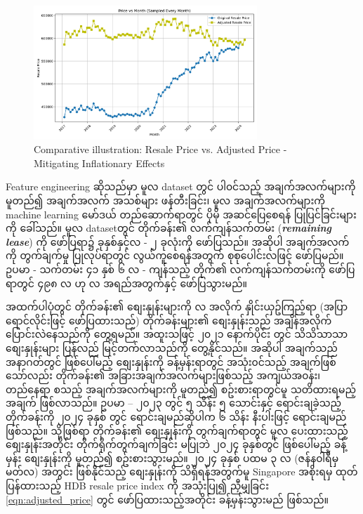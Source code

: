 \begin{figure}[h]%
\centering
\includegraphics[width=0.75\textwidth]{imgs/adjusted_price.png}
\caption{Comparative illustration: Resale Price vs. Adjusted Price - Mitigating Inflationary Effects }\label{fig:priceinflation}
\end{figure}

Feature engineering ဆိုသည်မှာ မူလ dataset တွင် ပါ၀င်သည့် အချက်အလက်များကို မူတည်၍ အချက်အလက် အသစ်များ ဖန်တီးခြင်း၊ မူလ အချက်အလက်များကို machine learning မော်ဒယ် တည်ဆောက်ရာတွင် ပိုမို အဆင်ပြေစေရန် ပြုပြင်ခြင်းများကို ခေါ်သည်။ မူလ datasetတွင် တိုက်ခန်း၏ လက်ကျန်သက်တမ်း (\textit{\textbf{remaining lease}}) ကို ဖော်ပြရာ၌ ခုနှစ်နှင့်လ - ၂ ခုလုံးကို ဖော်ပြသည်။ အဆိုပါ အချက်အလက်ကို တွက်ချက်မှု ပြုလုပ်ရာတွင် လွယ်ကူစေရန်အတွက် စုစုပေါင်းလဖြင့် ဖော်ပြမည်။ ဥပမာ - သက်တမ်း ၄၁ နှစ် ၆ လ - ကျန်သည့် တိုက်၏ လက်ကျန်သက်တမ်းကို ဖော်ပြရာတွင် ၄၉၈ လ ဟု  လ အရည်အတွက်နှင့် ဖော်ပြသွားမည်။ 

အထက်ပါပုံတွင် တိုက်ခန်း၏ စျေးနှုန်းများကို လ အလိုက် နှိုင်းယှဥ်ကြည့်ရာ (အပြာရောင်လိုင်းဖြင့် ဖော်ပြထားသည်) တိုက်ခန်းများ၏ စျေးနှုန်းသည် အချိန်အလိုက် ပြောင်းလဲနေသည်ကို တွေ့ရမည်။ အထူးသဖြင့် ၂၀၂၁ နောက်ပိုင်း တွင် သိသိသာသာ စျေးနှုန်းများ ပြန်လည် မြင့်တက်လာသည်ကို တွေ့နိုင်သည်။ အဆိုပါ အချက်သည် အနာဂတ်တွင် ဖြစ်ပေါ်မည့် စျေးနှုန်းကို ခန့်မှန်းရာတွင် အသုံး၀င်သည့် အချက်ဖြစ်သော်လည်း တိုက်ခန်း၏ အခြားအချက်အလက်များဖြစ်သည့် အကျယ်အ၀န်း၊ တည်နေရာ စသည့် အချက်အလက်များကို မူတည်၍ စဥ်းစားရာတွင်မူ သတိထားရမည့် အချက် ဖြစ်လာသည်။ ဥပမာ -- ၂၀၂၃ တွင် ၅ သိန်း ၅ သောင်းနှင့် ရောင်းချခဲ့သည့် တိုက်ခန်းကို ၂၀၂၄ ခုနှစ် တွင် ရောင်းချမည်ဆိုပါက ၆ သိန်း နီးပါးဖြင့် ရောင်းချမည် ဖြစ်သည်။ သို့ဖြစ်ရာ တိုက်ခန်း၏ စျေးနှုန်းကို တွက်ချက်ရာတွင် မူလ ပေးထားသည့် စျေးနှုန်းအတိုင်း တိုက်ရိုက်တွက်ချက်ခြင်း မပြုဘဲ ၂၀၂၄ ခုနှစ်တွင် ဖြစ်ပေါ်မည့် ခန့်မှန်း စျေးနှုန်းကို မူတည်၍ စဥ်းစားသွားမည်။ ၂၀၂၄ ခုနှစ် ပထမ ၃ လ (ဇန်န၀ါရီမှ မတ်လ) အတွင်း ဖြစ်နိုင်သည့် စျေးနှုန်းကို သိရှိရန်အတွက်မူ Singapore အစိုးရမှ ထုတ်ပြန်ထားသည့် HDB resale price index ကို အသုံးပြု၍ ညှီမျှခြင်း \ref{eqn:adjusted_price}  တွင် ဖော်ပြထားသည့်အတိုင်း ခန့်မှန်းသွားမည် ဖြစ်သည်။ 

